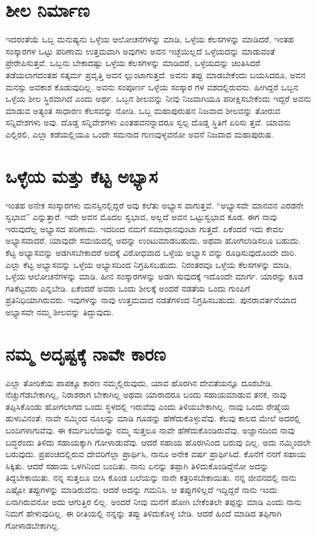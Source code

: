 \section{ಶೀಲ ನಿರ್ಮಾಣ}

ಇದರಂತೆಯೆ ಒಬ್ಬ ಮನುಷ್ಯನು ಒಳ್ಳೆಯ ಆಲೋಚನೆಗಳನ್ನು ಮಾಡಿ, ಒಳ್ಳೆಯ ಕೆಲಸಗಳನ್ನು ಮಾಡಿದರೆ, ಇಂತಹ ಸಂಸ್ಕಾರಗಳ ಒಟ್ಟು ಪರಿಣಾಮ ಉತ್ತಮವಾಗಿ ಅವುಗಳು ಅವನ ಇಚ್ಛೆಯಿಲ್ಲದೆ ಒಳ್ಳೆಯದನ್ನು ಮಾಡುವಂತೆ ಪ್ರೇರೇಪಿಸುತ್ತವೆ. ಒಬ್ಬನು ಬೇಕಾದಷ್ಟು ಒಳ್ಳೆಯ ಕೆಲಸಗಳನ್ನು ಮಾಡಿದರೆ, ಒಳ್ಳೆಯದನ್ನು ಚಿಂತಿಸಿದರೆ ತಡೆಯಲಾಗದಂತಹ ಸತ್ಕರ್ಮ ಪ್ರವೃತ್ತಿ ಅವನ ಲ್ಲುಂಟಾಗುತ್ತದೆ. ಅವನು ತಪ್ಪು ಮಾಡಬೇಕೆಂದು ಬಯಸಿದರೂ, ಅವನ ಮನಸ್ಸು ಅವಕಾಶ ಕೊಡುವುದಿಲ್ಲ. ಅವನು ಸಂಪೂರ್ಣ ಒಳ್ಳೆಯ ಸಂಸ್ಕಾರ ಗಳ ವಶದಲ್ಲಿರುವನು. ಹೀಗಿದ್ದರೆ ಒಬ್ಬನ ಒಳ್ಳೆಯ ಶೀಲ ಸ್ಥಿರವಾಗಿದೆ ಎಂದು ಅರ್ಥ. ಒಬ್ಬನ ಶೀಲವನ್ನು ನೀವು ನಿಜವಾಗಿಯೂ ಪರೀಕ್ಷಿಸಬೇಕೆಂದು ಇದ್ದರೆ ಅವನು ಮಾಡುವ ಅತ್ಯಂತ ಸಾಧಾರಣ ಕೆಲಸವನ್ನು ನೋಡಿ. ಒಬ್ಬ ಮಹಾಪುರುಷನ ನಿಜವಾದ ಶೀಲವನ್ನು ತೋರುವ ಸನ್ನಿವೇಶಗಳು ಅವು. ದೊಡ್ಡ ಸನ್ನಿವೇಶಗಳು ಎಂತಹವನನ್ನಾದರೂ ಸ್ವಲ್ಪ ದೊಡ್ಡ ಸ್ಥಿತಿಗೆ ಏರಿಸು ತ್ತವೆ. ಯಾವನು ಎಲ್ಲಿರಲಿ, ಎಲ್ಲಾ ಕಡೆಯಲ್ಲಿಯೂ ಒಂದೇ ಸಮನಾದ ಗುಣವುಳ್ಳವನೋ ಅವನೆ ನಿಜವಾದ ಮಹಾಪುರುಷ.


\section{ಒಳ್ಳೆಯ ಮತ್ತು ಕೆಟ್ಟ ಅಭ್ಯಾಸ}

ಇಂತಹ ಅನೇಕ ಸಂಸ್ಕಾರಗಳು ಮನಸ್ಸಿನಲ್ಲಿದ್ದರೆ ಅವು ಕಲೆತು ಅಭ್ಯಾಸ ವಾಗುತ್ತವೆ. “ಅಭ್ಯಾಸವೇ ಮಾನವನ ಎರಡನೇ ಸ್ವಭಾವ” ಎನ್ನುತ್ತಾರೆ. ಇದೇ ಅವನ ಮೊದಲ ಸ್ವಭಾವ, ಅಲ್ಲದೆ ಅವನ ಒಟ್ಟುಸ್ವಭಾವ ಕೂಡ. ಈಗ ನಾವು ಇರುವುದೆಲ್ಲ ಅಭ್ಯಾಸದ ಪರಿಣಾಮ. ಇದರಿಂದ ನಮಗೆ ಸಮಾಧಾನವುಂಟಾ ಗುತ್ತದೆ. ಏಕೆಂದರೆ ಇದು ಕೇವಲ ಅಭ್ಯಾಸವಾದರೆ, ಯಾವುದೇ ಸಮಯದಲ್ಲಿ ಅದನ್ನು ಉಂಟುಮಾಡಬಹುದು, ಅಥವಾ ಹೋಗಲಾಡಿಸಲೂ ಬಹುದು. ಕೆಟ್ಟ ಅಭ್ಯಾಸವನ್ನು ಅಡಗಿಸಬೇಕಾದರೆ ಅದಕ್ಕೆ ವಿರೋಧವಾದ ಒಳ್ಳೆಯ ಅಭ್ಯಾಸ ವನ್ನು ರೂಢಿಸುವುದೊಂದೇ ದಾರಿ. ಎಲ್ಲಾ ಕೆಟ್ಟ ಅಭ್ಯಾಸವನ್ನು ಒಳ್ಳೆಯ ಅಭ್ಯಾಸದಿಂದ ನಿಗ್ರಹಿಸಬಹುದು. ನಿರಂತರವೂ ಒಳ್ಳೆಯ ಕೆಲಸಗಳನ್ನು ಮಾಡಿ, ಒಳ್ಳೆಯ ಆಲೋಚನೆಗಳನ್ನು ಮಾಡಿ. ಹೀನ ಸಂಸ್ಕಾರಗಳನ್ನು ಅಡಗಿ ಸುವುದಕ್ಕೆ ಇದೊಂದೇ ಮಾರ್ಗ. ಯಾರನ್ನು ಕೂಡ ಗತಿಕೆಟ್ಟವರು ಎನ್ನಬೇಡಿ. ಏಕೆಂದರೆ ಅವರು ಒಂದು ಶೀಲಕ್ಕೆ ಅಂದರೆ ನಡತೆಯ ಒಂದು ಗುಂಪಿಗೆ ಪ್ರತಿನಿಧಿಯಾಗಿರುವರು. ಇವುಗಳನ್ನು ನಾವು ಉತ್ತಮವಾದ ನಡತೆಗಳಿಂದ ನಿಗ್ರಹಿಸಬಹುದು. ಪುನರಾವರ್ತನೆಯಾದ ಅಭ್ಯಾಸವೇ ನಮ್ಮ ಶೀಲವನ್ನು ತಿದ್ದುವುದು.


\section{ನಮ್ಮ ಅದೃಷ್ಟಕ್ಕೆ ನಾವೇ ಕಾರಣ}

ಎಲ್ಲಾ ತೋರಿಕೆಯ ಪಾಪಕ್ಕೂ ಕಾರಣ ನಮ್ಮಲ್ಲಿರುವುದು, ಯಾವ ಹೊರಗಿನ ದೇವತೆಯನ್ನೂ ದೂರಬೇಡಿ. ನೆಚ್ಚುಗೆಡಬೇಕಾಗಿಲ್ಲ, ನಿರಾಶರಾಗ ಬೇಕಾಗಿಲ್ಲ ಅಥವಾ ಯಾರಾದರೂ ಬಂದು ಸಹಾಯಮಾಡುವ ತನಕ, ನಾವು ತಪ್ಪಿಸಿಕೊಂಡು ಹೋಗಲಾಗದ ಒಂದು ಸ್ಥಳದಲ್ಲಿ ಇರುವೆವು ಎಂದು ತಿಳಿಯಬೇಕಾಗಿಲ್ಲ. ನಾವು ಒಂದು ರೇಷ್ಮೆಯ ಹುಳುವಿನಂತೆ; ನಾವೇ ನಮ್ಮಿಂದ ನೂಲನ್ನು ಮಾಡಿ ಗೂಡನ್ನು ಹೆಣೆದುಕೊಳ್ಳುವೆವು. ಕೆಲವು ಕಾಲದ ಮೇಲೆ ಅದರಲ್ಲಿ ಬಂದಿಗಳಾಗುವೆವು. ಈ ಕರ್ಮಬಲೆಯನ್ನು ನಮ್ಮ ಸುತ್ತಲೂ ನಾವೇ ಹೆಣೆದುಕೊಂಡಿರುವೆವು. ಅಜ್ಞಾನದಿಂದ ನಾವು ಬದ್ಧರೆಂದು ತಿಳಿದು ಸಹಾಯಕ್ಕಾಗಿ ಗೋಳಾಡುವೆವು. ಆದರೆ ಸಹಾಯ ಹೊರಗಿನಿಂದ ಬರುವು ದಿಲ್ಲ. ಅದು ನಮ್ಮಿಂದಲೇ ಬರುವುದು. ಪ್ರಪಂಚದಲ್ಲಿರುವ ದೇವರಿಗೆಲ್ಲಾ ಪ್ರಾರ್ಥಿಸಿ, ನಾನೂ ಅನೇಕ ವರ್ಷ ಪ್ರಾರ್ಥಿಸಿದೆ. ಕೊನೆಗೆ ನನಗೆ ಸಹಾಯ ಸಿಕ್ಕಿತು. ಆದರೆ ಸಹಾಯ ಒಳಗಿನಿಂದ ಬಂದಿತು. ನಾನು ಏನನ್ನು ತಪ್ಪಾಗಿ ತಿಳಿದುಕೊಂಡಿದ್ದೆನೋ ಅದನ್ನು ತಿದ್ದಬೇಕಾಯಿತು. ನನ್ನ ಸುತ್ತಲೂ ಬೀಸಿ ಕೊಂಡ ಬಲೆಯನ್ನು ನಾನೇ ಕತ್ತರಿಸಬೇಕಾಯಿತು. ನನ್ನ ಜೀವನದಲ್ಲಿ ನಾನು ಎಷ್ಟೋ ತಪ್ಪುಗಳನ್ನು ಮಾಡಿರುವೆನು. ಆದರೆ ಅದನ್ನು ಗಮನಿಸಿ. ಆ ತಪ್ಪುಗಳಿಲ್ಲದೆ ಇದ್ದಿದ್ದರೆ ನಾನು ಇಂದು ಏನಾಗಿರುವನೋ ಅದು ಆಗುತ್ತಿರ ಲಿಲ್ಲ. ಅಂದರೆ ನೀವು ಮನೆಗೆ ಹೋಗಿ ಬೇಕೆಂತಲೇ ತಪ್ಪನ್ನು ಮಾಡಿ ಎಂದು ನಾನು ನಿಮಗೆ ಹೇಳುವುದಿಲ್ಲ. ಈ ರೀತಿಯಲ್ಲಿ ನನ್ನನ್ನು ತಪ್ಪು ತಿಳಿದುಕೊಳ್ಳ ಬೇಡಿ. ಆದರೆ ಹಿಂದೆ ಮಾಡಿದ ತಪ್ಪಿಗಾಗಿ ಗೋಳಾಡಬೇಕಾಗಿಲ್ಲ.


